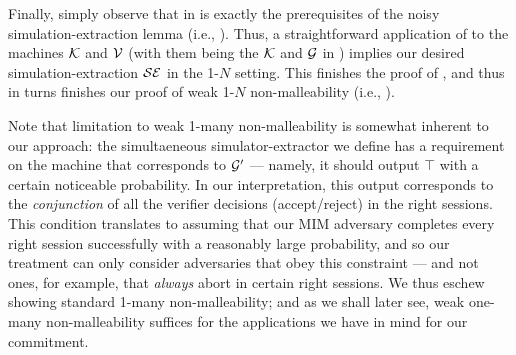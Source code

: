  Finally, simply observe that  in  is exactly the prerequisites of the noisy simulation-extraction lemma (i.e., ). Thus, a straightforward application of  to the machines $\mathcal{K}$ and $\mathcal{V}$ (with them being the $\mathcal{K}$ and $\mathcal{G}$ in ) implies our desired simulation-extraction $\mathcal{SE}$ in the 1-$N$ setting. This finishes the proof of  , and thus in turns finishes our proof of weak 1-$N$ non-malleability (i.e., ). 

Note that limitation to weak 1-many non-malleability is somewhat inherent to our approach: the simultaeneous simulator-extractor we define has a requirement on the machine that corresponds to $\mathcal{G}'$ --- namely, it should output $\top$ with a certain noticeable probability. In our interpretation, this output corresponds to the {\em conjunction} of all the verifier decisions (accept/reject) in the right sessions. This condition translates to assuming that our MIM adversary completes every right session successfully with a reasonably large probability, and so our treatment can only consider adversaries that obey this constraint --- and not ones, for example, that {\em always} abort in certain right sessions. We thus eschew showing standard 1-many non-malleability; and as we shall later see, weak one-many non-malleability suffices for the applications we have in mind for our commitment. 